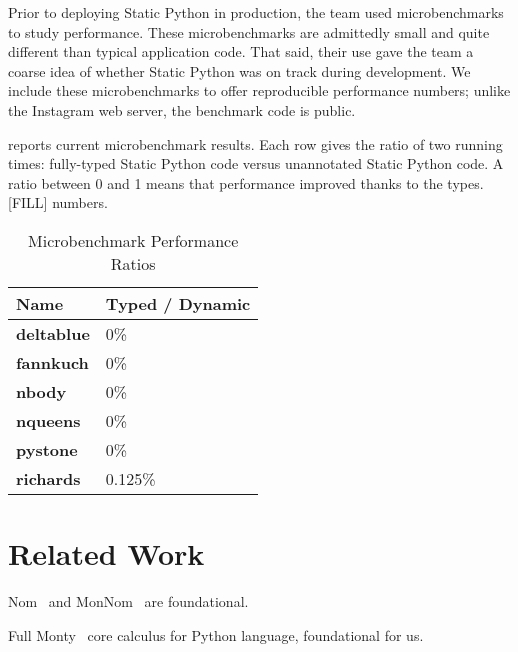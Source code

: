 \documentclass[english,cleveref,submission]{programming}
\newcommand{\SP}{Static Python}
\newcommand{\bmname}[1]{\textbf{#1}}
\begin{document}



Prior to deploying \SP{} in production, the team used microbenchmarks to study performance.
These microbenchmarks are admittedly small and quite different than typical application code.
That said, their use gave the team a coarse idea of whether \SP{} was on track during development.
We include these microbenchmarks to offer reproducible performance numbers;
unlike the Instagram web server, the benchmark code is public.

 reports current microbenchmark results.
Each row gives the ratio of two running times: fully-typed \SP{} code versus
unannotated \SP{} code.
A ratio between 0 and 1 means that performance improved thanks to the types.
[FILL] numbers.

\begin{table}[t]
  \caption{Microbenchmark Performance Ratios}
  \label{t:microbenchmark}
  \begin{tabular}{ll}
    Name               & Typed / Dynamic \\\midrule
    \bmname{deltablue} &             0\% \\
    \bmname{fannkuch}  &             0\% \\
    \bmname{nbody}     &             0\% \\
    \bmname{nqueens}   &             0\% \\
    \bmname{pystone}   &             0\% \\
    \bmname{richards}  &         0.125\% \\
  \end{tabular}
\end{table}





\section{Related Work}
\label{s:related}

Nom~\cite{mt-oopsla-2017} and MonNom~\cite{mt-oopsla-2021} are foundational.

Full Monty~\cite{pmmwplck-oopsla-2013} core calculus for Python language, foundational for us.
\end{document}
